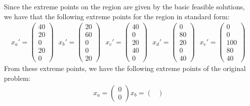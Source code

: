 \documentclass{article}
\begin{document}
\begin{itemize}
    
    Since the extreme points on the region are given by the basic feasible solutions, we have that the following extreme points for the region in standard form:
    \begin{align*}
        x_a' = \begin{pmatrix}
            40\\
            20\\
            0\\
            20\\
            0
        \end{pmatrix}
        \:\:\:
       x_b' =  \begin{pmatrix}
            20\\
            60\\
            0\\
            0\\
            20
        \end{pmatrix}
        \:\:\:
       x_c' = \begin{pmatrix}
            40\\
            0\\
            20\\
            40\\
            0
        \end{pmatrix}
        \:\:\:
       x_d' = \begin{pmatrix}
            0\\
            80\\
            20\\
            0\\
            40
        \end{pmatrix}
        \:\:\:
       x_e' = \begin{pmatrix}
            0\\
            0\\
            100\\
            80\\
            40
        \end{pmatrix}
    \end{align*}        
    From these extreme points, we have the following extreme points of the original problem:
    \begin{align*}
        x_a = \begin{pmatrix}
            0\\
            0
        \end{pmatrix}
        x_b = \begin{pmatrix}

\end{pmatrix}
\end{align*}
\end{itemize}
\end{document}
